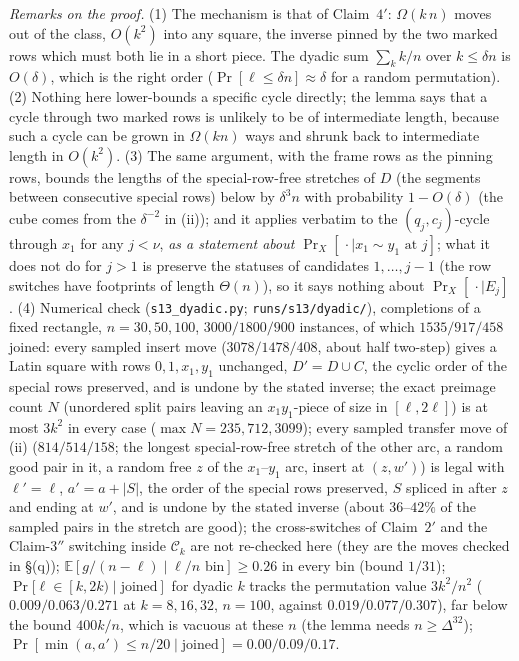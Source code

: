 \emph{Remarks on the proof.}  (1) The mechanism is that of Claim~$4'$:
$\Omega(k\,n)$ moves out of the class, $O(k^2)$ into any square, the
inverse pinned by the two marked rows which must both lie in a short
piece.  The dyadic sum $\sum_k k/n$ over $k\le\delta n$ is $O(\delta)$,
which is the right order ($\Pr[\ell\le\delta n]\approx\delta$ for a
random permutation).  (2) Nothing here lower-bounds a specific cycle
directly; the lemma says that a cycle through two marked rows is
unlikely to be of intermediate length, because such a cycle can be
grown in $\Omega(kn)$ ways and shrunk back to intermediate length in
$O(k^2)$.  (3) The same argument, with the frame rows as the pinning
rows, bounds the lengths of the special-row-free stretches of $D$
(the segments between consecutive special rows) below by $\delta^3n$
with probability $1-O(\delta)$ (the cube comes from the
$\delta^{-2}$ in (ii)); and it applies verbatim to the
$(q_j,c_j)$-cycle through $x_1$ for any $j<\nu$, \emph{as a statement
about $\Pr_X[\,\cdot\mid x_1\sim y_1\text{ at }j]$}; what it does not
do for $j>1$ is preserve the statuses of candidates $1,\dots,j-1$
(the row switches have footprints of length $\Theta(n)$), so it says
nothing about $\Pr_X[\,\cdot\mid E_j]$.
(4) Numerical check (\texttt{s13\_dyadic.py}; \texttt{runs/s13/dyadic/}),
completions of a fixed rectangle, $n=30,50,100$, $3000/1800/900$
instances, of which $1535/917/458$ joined: every sampled insert move
($3078/1478/408$, about half two-step) gives a Latin square with rows
$0,1,x_1,y_1$ unchanged, $D'=D\cup C$, the cyclic order of the special
rows preserved, and is undone by the stated inverse; the exact
preimage count $N$ (unordered split pairs leaving an $x_1y_1$-piece of
size in $[\ell,2\ell]$) is at most $3k^2$ in every case
($\max N=235,712,3099$); every sampled transfer move of (ii)
($814/514/158$; the longest special-row-free stretch of the other
arc, a random good pair in it, a random free $z$ of the $x_1$--$y_1$
arc, insert at $(z,w')$) is legal with $\ell'=\ell$, $a'=a+|S|$, the
order of the special rows preserved, $S$ spliced in after $z$ and
ending at $w'$, and is undone by the stated inverse (about $36$--$42\%$ of
the sampled pairs in the stretch are good); the cross-switches of
Claim~$2'$ and the Claim-$3''$ switching inside $\mathcal C_k$ are not
re-checked here (they are the moves checked in \S(q));
$\mathbb E[g/(n-\ell)\mid\ell/n\text{ bin}]\ge0.26$ in every bin
(bound $1/31$); $\Pr[\ell\in[k,2k)\mid\text{joined}]$ for dyadic $k$
tracks the permutation value $3k^2/n^2$ ($0.009/0.063/0.271$ at
$k=8,16,32$, $n=100$, against $0.019/0.077/0.307$), far below the
bound $400k/n$, which is vacuous at these $n$ (the lemma needs
$n\ge\Delta^{32}$); $\Pr[\min(a,a')\le n/20\mid\text{joined}]=0.00/0.09/0.17$.

